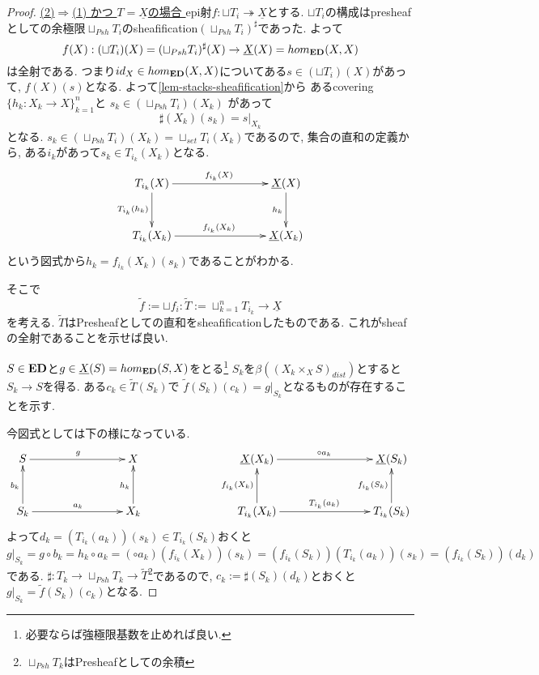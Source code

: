 \documentclass[dvipdfmx,a4paper,11pt]{report}
\theoremstyle{definition}
\begin{document}
\begin{proof}
\underline{(2)$\Rightarrow$(1) かつ $T = \underline{X}$の場合 }
epi射$f : \sqcup T_i \twoheadrightarrow \underline{X}$とする.
$\sqcup T_i $の構成はpresheafとしての余極限$\sqcup_{Psh} T_i $のsheafification$(\sqcup_{Psh} T_i )^{\sharp}$であった.
よって
$$
f(X) : (\sqcup T_i)(X) = (\sqcup_{Psh} T_i )^{\sharp}(X) \to \underline{X}(X)=hom_{{\bf ED}}(X,X)
$$ 
は全射である. 
つまり$id_{X} \in  hom_{{\bf ED}}(X,X)$についてある$s \in (\sqcup T_i)(X)$があって, $f(X)(s)$となる.
よって\ref{lem-stacks-sheafification}から
あるcovering$\{h_k : X_k \to X\}_{k=1}^{n}$と
$s_k \in (\sqcup_{Psh} T_i )(X_k)$
があって
$$
\sharp(X_k)(s_k)= s|_{X_k}
$$
となる. 
$s_k \in (\sqcup_{Psh} T_i) (X_k) = \sqcup_{set} T_{i}(X_k)$であるので, 
集合の直和の定義から, 
ある$i_k$があって$s_k \in T_{i_k}(X_k)$となる. 
\begin{equation*}
\xymatrix@C=80pt@R=30pt{
T_{i_k}(X)\ar@{->}[r]^{f_{i_k}(X)}\ar@{->}[d]_{T_{i_k}(h_k)}
&\underline{X}(X) \ar@{->}[d]_{h_k} \\
T_{i_k}(X_k) \ar@{->}[r]^{f_{i_k}(X_k)}
&\underline{X}(X_k) \\   
}
\end{equation*}
という図式から$h_{k} = f_{i_k}(X_k)(s_k)$であることがわかる. 

そこで
$$
\widetilde{f}:=\sqcup f_i : \widetilde{T}:=\sqcup_{k=1}^{n} T_{i_k} \to \underline{X}
$$
を考える. $\widetilde{T}$はPresheafとしての直和をsheafificationしたものである.
これがsheafの全射であることを示せば良い.

$S \in {\bf ED}$と$g \in \underline{X}(S) = hom_{{\bf ED}}(S,X)$をとる\footnote{必要ならば強極限基数を止めれば良い.}
$S_k$を$\beta((X_{k} \times_{X} S)_{dist})$とすると$S_k \to S$を得る.
ある$c_k \in \widetilde{T}(S_k)$で
$\widetilde{f}(S_k)(c_k) = g|_{S_k}$となるものが存在することを示す.

今図式としては下の様になっている. 
\begin{equation*}
\xymatrix@C=80pt@R=30pt{
S \ar@{->}[r]^{g}
&X
&
\underline{X}(X_k) \ar@{->}[r]^{\circ a_k}
&\underline{X}(S_k) \\
S_k \ar@{->}[r]^{a_k} \ar@{->}[u]^{b_k}
&X_k \ar@{->}[u]^{h_k}
&
T_{i_k}(X_k) \ar@{->}[r]^{T_{i_k}(a_k)} \ar@{->}[u]^{f_{i_k}(X_k)}
&T_{i_k}(S_k) \ar@{->}[u]^{f_{i_k}(S_k)}\\   
}
\end{equation*}
よって$d_k =(T_{i_k}(a_k))(s_k) \in T_{i_k}(S_k)$おくと
$$
g|_{S_{k}}
=
g \circ b_k
=
h_k \circ a_{k}
=(\circ a_k)(f_{i_k}(X_k))(s_k)
=
(f_{i_k}(S_k))(T_{i_k}(a_k))(s_k)
= (f_{i_k}(S_k))(d_k)
$$
である. $\sharp :T_k \to \sqcup_{Psh} T_{k} \to \widetilde{T}$\footnote{$\sqcup_{Psh} T_{k} $はPresheafとしての余積}であるので, $c_k:=\sharp(S_k)(d_k)$とおくと
$g|_{S_{k}} = \widetilde{f}(S_k)(c_k)$となる. 


\end{proof}
\end{document}
